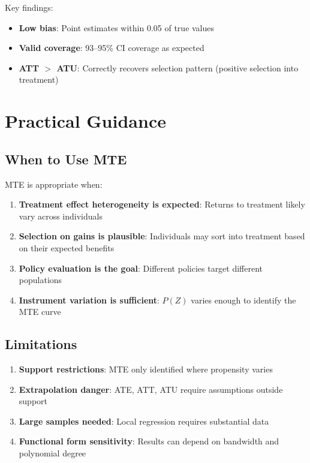 Key findings:
\begin{itemize}
\item \textbf{Low bias}: Point estimates within 0.05 of true values
\item \textbf{Valid coverage}: 93--95\% CI coverage as expected
\item \textbf{ATT $>$ ATU}: Correctly recovers selection pattern (positive selection into treatment)
\end{itemize}

\section{Practical Guidance}
\label{sec:mte-guidance}

\subsection{When to Use MTE}

MTE is appropriate when:

\begin{enumerate}
\item \textbf{Treatment effect heterogeneity is expected}: Returns to treatment likely vary across individuals
\item \textbf{Selection on gains is plausible}: Individuals may sort into treatment based on their expected benefits
\item \textbf{Policy evaluation is the goal}: Different policies target different populations
\item \textbf{Instrument variation is sufficient}: $P(Z)$ varies enough to identify the MTE curve
\end{enumerate}

\subsection{Limitations}

\begin{enumerate}
\item \textbf{Support restrictions}: MTE only identified where propensity varies
\item \textbf{Extrapolation danger}: ATE, ATT, ATU require assumptions outside support
\item \textbf{Large samples needed}: Local regression requires substantial data
\item \textbf{Functional form sensitivity}: Results can depend on bandwidth and polynomial degree
\end{enumerate}

